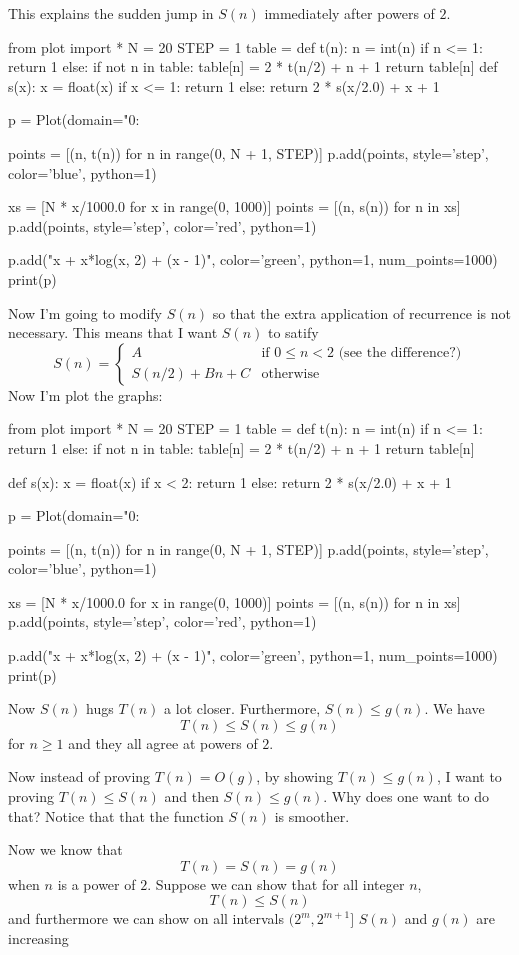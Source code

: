 This explains the sudden jump in $S(n)$ immediately after powers of $2$.

\begin{python}
from plot import *
N = 20
STEP = 1
table = {}
def t(n):
    n = int(n)
    if n <= 1: return 1
    else:
        if not n in table:
            table[n] = 2 * t(n/2) + n + 1
        return table[n]
def s(x):
    x = float(x)
    if x <= 1: return 1
    else:
        return 2 * s(x/2.0) + x + 1

p = Plot(domain="0:%

points = [(n, t(n)) for n in range(0, N + 1, STEP)]
p.add(points, style='step', color='blue', python=1)

xs = [N * x/1000.0 for x in range(0, 1000)]
points = [(n, s(n)) for n in xs]
p.add(points, style='step', color='red', python=1)

p.add("x + x*log(x, 2) + (x - 1)", color='green', python=1, num_points=1000)
print(p)
\end{python}

Now I'm going to modify $S(n)$ so that the extra application of
recurrence is not necessary.
This means that I want $S(n)$ to satify
\[
S(n) = 
\begin{cases}
A               & \text{if $0 \leq n < 2$ (see the difference?)} \\
S(n/2) + Bn + C &\text{otherwise} 
\end{cases}
\]
Now I'm plot the graphs:

\begin{python}
from plot import *
N = 20
STEP = 1
table = {}
def t(n):
    n = int(n)
    if n <= 1: return 1
    else:
        if not n in table:
            table[n] = 2 * t(n/2) + n + 1
        return table[n]

def s(x):
    x = float(x)
    if x < 2: return 1
    else:
        return 2 * s(x/2.0) + x + 1

p = Plot(domain="0:%

points = [(n, t(n)) for n in range(0, N + 1, STEP)]
p.add(points, style='step', color='blue', python=1)

xs = [N * x/1000.0 for x in range(0, 1000)]
points = [(n, s(n)) for n in xs]
p.add(points, style='step', color='red', python=1)

p.add("x + x*log(x, 2) + (x - 1)", color='green', python=1, num_points=1000)
print(p)
\end{python}

Now $S(n)$ hugs $T(n)$ a lot closer.
Furthermore, $S(n) \leq g(n)$.
We have
\[
T(n) \leq S(n) \leq g(n)
\]
for $n \geq 1$ and they all agree at powers of $2$.

Now instead of proving $T(n) = O(g)$, by showing $T(n) \leq g(n)$,
I want to proving $T(n) \leq S(n)$ and then $S(n) \leq g(n)$.
Why does one want to do that?
Notice that that the function $S(n)$ is smoother.

Now we know that 
\[
T(n) = S(n) = g(n)
\]
when $n$ is a power of $2$.
Suppose we can show that for all integer $n$,
\[
T(n) \leq S(n)
\]
and furthermore we can show on all intervals $(2^m, 2^{m+1}]$
$S(n)$ and $g(n)$ are increasing

